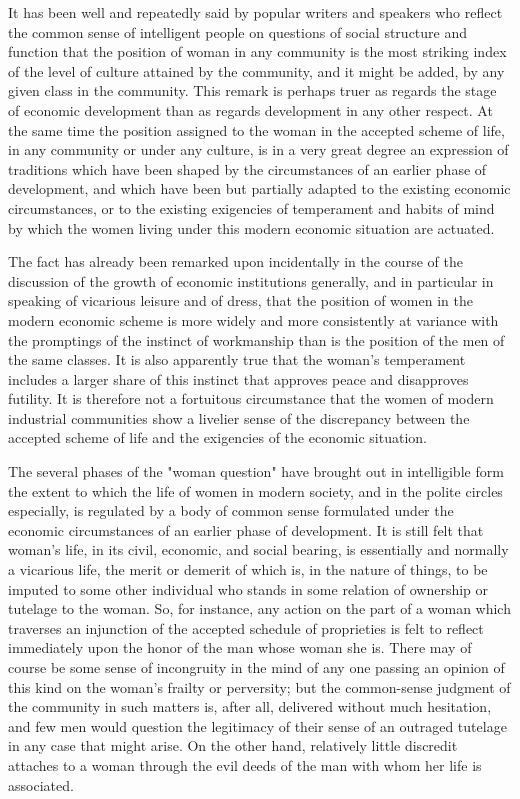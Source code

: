 \documentclass[12pt]{report}
\begin{document}
It has been well and repeatedly said by popular writers and speakers who
reflect the common sense of intelligent people on questions of social
structure and function that the position of woman in any community
is the most striking index of the level of culture attained by the
community, and it might be added, by any given class in the community.
This remark is perhaps truer as regards the stage of economic
development than as regards development in any other respect. At the
same time the position assigned to the woman in the accepted scheme of
life, in any community or under any culture, is in a very great degree
an expression of traditions which have been shaped by the circumstances
of an earlier phase of development, and which have been but partially
adapted to the existing economic circumstances, or to the existing
exigencies of temperament and habits of mind by which the women living
under this modern economic situation are actuated.

The fact has already been remarked upon incidentally in the course of
the discussion of the growth of economic institutions generally, and
in particular in speaking of vicarious leisure and of dress, that the
position of women in the modern economic scheme is more widely and
more consistently at variance with the promptings of the instinct of
workmanship than is the position of the men of the same classes. It
is also apparently true that the woman's temperament includes a larger
share of this instinct that approves peace and disapproves futility.
It is therefore not a fortuitous circumstance that the women of modern
industrial communities show a livelier sense of the discrepancy
between the accepted scheme of life and the exigencies of the economic
situation.

The several phases of the "woman question" have brought out in
intelligible form the extent to which the life of women in modern
society, and in the polite circles especially, is regulated by a body of
common sense formulated under the economic circumstances of an earlier
phase of development. It is still felt that woman's life, in its civil,
economic, and social bearing, is essentially and normally a vicarious
life, the merit or demerit of which is, in the nature of things, to
be imputed to some other individual who stands in some relation of
ownership or tutelage to the woman. So, for instance, any action on the
part of a woman which traverses an injunction of the accepted schedule
of proprieties is felt to reflect immediately upon the honor of the man
whose woman she is. There may of course be some sense of incongruity
in the mind of any one passing an opinion of this kind on the woman's
frailty or perversity; but the common-sense judgment of the community in
such matters is, after all, delivered without much hesitation, and few
men would question the legitimacy of their sense of an outraged tutelage
in any case that might arise. On the other hand, relatively little
discredit attaches to a woman through the evil deeds of the man with
whom her life is associated.
\end{document}

